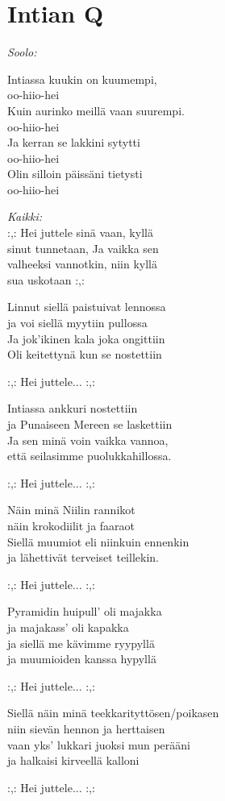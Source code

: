 \section{Intian Q}
\vspace*{-0.55cm}
\textit{Soolo:}

Intiassa kuukin on kuumempi,\\
oo-hiio-hei\\
Kuin aurinko meillä vaan suurempi.\\
oo-hiio-hei\\
Ja kerran se lakkini sytytti\\
oo-hiio-hei\\
Olin silloin päissäni tietysti\\
oo-hiio-hei

\textit{Kaikki:}\\
:,: Hei juttele sinä vaan, kyllä\\
sinut tunnetaan, Ja vaikka sen\\
valheeksi vannotkin, niin kyllä\\
sua uskotaan :,:

Linnut siellä paistuivat lennossa\\
ja voi siellä myytiin pullossa\\
Ja jok’ikinen kala joka ongittiin\\
Oli keitettynä kun se nostettiin

:,: Hei juttele... :,:

Intiassa ankkuri nostettiin\\
ja Punaiseen Mereen se laskettiin\\
Ja sen minä voin vaikka vannoa,\\
että seilasimme puolukkahillossa.

:,: Hei juttele... :,:

Näin minä Niilin rannikot\\
näin krokodiilit ja faaraot\\
Siellä muumiot eli niinkuin ennenkin\\
ja lähettivät terveiset teillekin.

:,: Hei juttele... :,:

Pyramidin huipull' oli majakka\\
ja majakass' oli kapakka\\
ja siellä me kävimme ryypyllä\\
ja muumioiden kanssa hypyllä

:,: Hei juttele... :,:

Siellä näin minä teekkarityttösen/poikasen\\
niin sievän hennon ja herttaisen\\
vaan yks' lukkari juoksi mun perääni\\
ja halkaisi kirveellä kalloni

:,: Hei juttele... :,:
